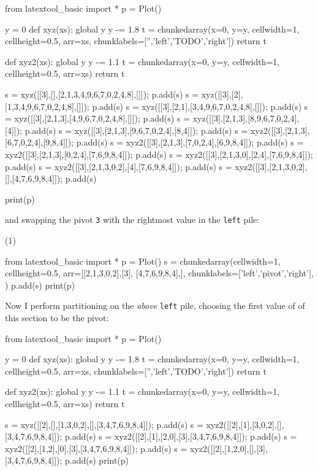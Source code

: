 {\small
\begin{python}
from latextool_basic import *
p = Plot()

y = 0
def xyz(xs):
    global y
    y -= 1.8
    t = chunkedarray(x=0, y=y,
                        cellwidth=1, 
                        cellheight=0.5,
                        arr=xs,
                        chunklabels=['','left','TODO','right'])
    return t

def xyz2(xs):
    global y
    y -= 1.1
    t = chunkedarray(x=0, y=y,
                        cellwidth=1, 
                        cellheight=0.5,
                        arr=xs)
    return t

s = xyz([[3],[],[2,1,3,4,9,6,7,0,2,4,8],[]]); p.add(s)
s = xyz([[3],[2],[1,3,4,9,6,7,0,2,4,8],[]]); p.add(s)
s = xyz([[3],[2,1],[3,4,9,6,7,0,2,4,8],[]]); p.add(s)
s = xyz([[3],[2,1,3],[4,9,6,7,0,2,4,8],[]]); p.add(s)
s = xyz([[3],[2,1,3],[8,9,6,7,0,2,4],[4]]); p.add(s)
s = xyz([[3],[2,1,3],[9,6,7,0,2,4],[8,4]]); p.add(s)
s = xyz2([[3],[2,1,3],[6,7,0,2,4],[9,8,4]]); p.add(s)
s = xyz2([[3],[2,1,3],[7,0,2,4],[6,9,8,4]]); p.add(s)
s = xyz2([[3],[2,1,3],[0,2,4],[7,6,9,8,4]]); p.add(s)
s = xyz2([[3],[2,1,3,0],[2,4],[7,6,9,8,4]]); p.add(s)
s = xyz2([[3],[2,1,3,0,2],[4],[7,6,9,8,4]]); p.add(s)
s = xyz2([[3],[2,1,3,0,2],[],[4,7,6,9,8,4]]); p.add(s)

print(p)
\end{python}
}

and swapping the pivot \verb!3! with the rightmost value in the \verb!left!
pile:
\begin{center}
(1)
\end{center}
{\small
\begin{python}
from latextool_basic import *
p = Plot()
s = chunkedarray(cellwidth=1,
                   cellheight=0.5,
                   arr=[[2,1,3,0,2],[3], [4,7,6,9,8,4],],
                   chunklabels=['left','pivot','right'],
)
p.add(s)
print(p)
\end{python}
}

Now I perform partitioning on the \textit{above} \verb!left! pile,
choosing the first value of of this section to be the pivot:
{\small
\begin{python}
from latextool_basic import *
p = Plot()

y = 0
def xyz(xs):
    global y
    y -= 1.8
    t = chunkedarray(x=0, y=y,
                        cellwidth=1, 
                        cellheight=0.5,
                        arr=xs,
                        chunklabels=['','left','TODO','right'])
    return t

def xyz2(xs):
    global y
    y -= 1.1
    t = chunkedarray(x=0, y=y,
                        cellwidth=1, 
                        cellheight=0.5,
                        arr=xs)
    return t

s = xyz([[2],[],[1,3,0,2],[],[3,4,7,6,9,8,4]]); p.add(s)
s = xyz2([[2],[1],[3,0,2],[],[3,4,7,6,9,8,4]]); p.add(s)
s = xyz2([[2],[1],[2,0],[3],[3,4,7,6,9,8,4]]); p.add(s)
s = xyz2([[2],[1,2],[0],[3],[3,4,7,6,9,8,4]]); p.add(s)
s = xyz2([[2],[1,2,0],[],[3],[3,4,7,6,9,8,4]]); p.add(s)
print(p)
\end{python}
}

